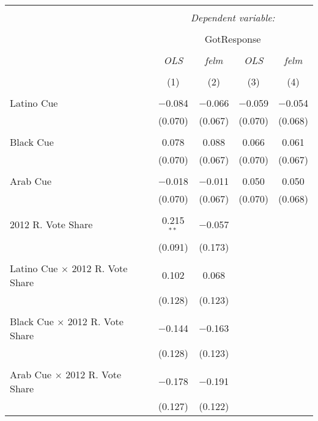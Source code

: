 
\begin{table}[!htbp] \centering 
  \caption{} 
  \label{tab:trumpHTE} 
\small 
\begin{tabular}{@{\extracolsep{5pt}}lcccc} 
\\[-1.8ex]\hline 
\hline \\[-1.8ex] 
 & \multicolumn{4}{c}{\textit{Dependent variable:}} \\ 
\cline{2-5} 
\\[-1.8ex] & \multicolumn{4}{c}{GotResponse} \\ 
\\[-1.8ex] & \textit{OLS} & \textit{felm} & \textit{OLS} & \textit{felm} \\ 
\\[-1.8ex] & (1) & (2) & (3) & (4)\\ 
\hline \\[-1.8ex] 
 Latino Cue & $-$0.084 & $-$0.066 & $-$0.059 & $-$0.054 \\ 
  & (0.070) & (0.067) & (0.070) & (0.068) \\ 
  & & & & \\ 
 Black Cue & 0.078 & 0.088 & 0.066 & 0.061 \\ 
  & (0.070) & (0.067) & (0.070) & (0.067) \\ 
  & & & & \\ 
 Arab Cue & $-$0.018 & $-$0.011 & 0.050 & 0.050 \\ 
  & (0.070) & (0.067) & (0.070) & (0.068) \\ 
  & & & & \\ 
 2012 R. Vote Share & 0.215$^{**}$ & $-$0.057 &  &  \\ 
  & (0.091) & (0.173) &  &  \\ 
  & & & & \\ 
 Latino Cue $\times$ 2012 R. Vote Share & 0.102 & 0.068 &  &  \\ 
  & (0.128) & (0.123) &  &  \\ 
  & & & & \\ 
 Black Cue $\times$ 2012 R. Vote Share & $-$0.144 & $-$0.163 &  &  \\ 
  & (0.128) & (0.123) &  &  \\ 
  & & & & \\ 
 Arab Cue $\times$ 2012 R. Vote Share & $-$0.178 & $-$0.191 &  &  \\ 
  & (0.127) & (0.122) &  &  \\ 

\end{tabular}
\end{table}
